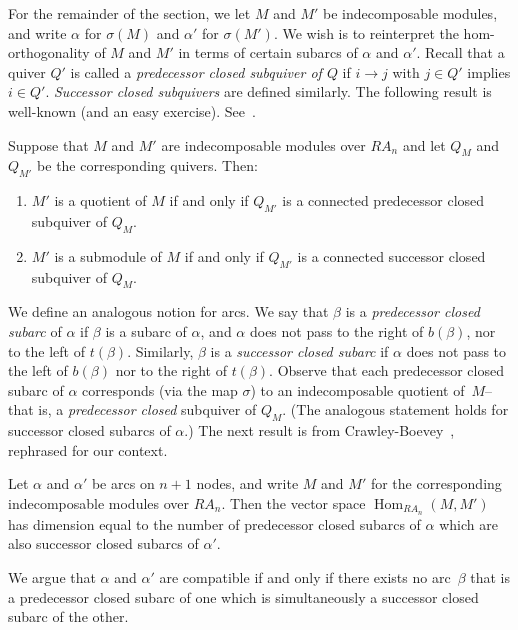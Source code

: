 \documentclass[ALCO,ThmDefs,Unicode,epreuves]{cedram}
\DeclareMathOperator{\Hom}{Hom}
\newcommand{\calT}{\mathcal{T}}
\renewcommand{\1}{\hat{1}}
\newcommand{\0}{\hat{0}}
\newcommand{\newword}[1]{\emph{#1}}
\begin{document}
For the remainder of the section, we let $M$ and $M'$ be indecomposable modules, and write $\alpha$ for $\sigma(M)$ and $\alpha'$ for $\sigma(M')$.
We wish is to reinterpret the hom-orthogonality of $M$ and $M'$ in terms of certain subarcs of $\alpha$ and $\alpha'$.
 Recall that a quiver $Q'$ is called a \newword{predecessor closed subquiver of $Q$} if
$i\rightarrow j$ with $j\in Q'$ implies $i\in Q'$. \newword{Successor closed
subquivers} are defined similarly.
The following result is well-known (and an easy exercise).
See~\cite[Section~2]{Crawley-Boevey}.
\begin{proposition}\label{cor: factors and subs}
Suppose that $M$ and $M'$ are indecomposable modules over $RA_n$
and let $Q_M$ and $Q_{M'}$ be the corresponding quivers.
Then:
\begin{enumerate}
\item $M'$ is a quotient of $M$ if and only if $Q_{M'}$ is a connected predecessor closed subquiver of $Q_M$.
\item $M'$ is a submodule of $M$ if and only if $Q_{M'}$ is a connected successor closed subquiver of $Q_M$.
\end{enumerate}
\end{proposition}

We define an analogous notion for arcs.
We say that $\beta$ is a \newword{predecessor closed subarc} of $\alpha$ if $\beta$ is a subarc of $\alpha$, and $\alpha$ does not pass to the right of $b(\beta)$, nor to the left of $t(\beta)$.
Similarly, $\beta$ is a \newword{successor closed subarc} if $\alpha$ does not pass to the left of $b(\beta)$ nor to the right of $t(\beta)$.
Observe that each predecessor closed subarc of $\alpha$ corresponds (via the map $\sigma$) to an indecomposable quotient of~$M$--that is, a \emph{predecessor closed} subquiver of $Q_M$.
(The analogous statement holds for successor closed subarcs of $\alpha$.)
The next result is from Crawley-Boevey~\cite[Section~2]{Crawley-Boevey}, rephrased for our context.

\begin{proposition}\label{prop:homs-between-shards}
Let $\alpha$ and $\alpha'$ be arcs on $n+1$ nodes, and write $M$ and $M'$ for the corresponding indecomposable modules over $RA_n$.
Then the vector space $\Hom_{RA_n} (M, M')$ has dimension equal to the number of predecessor closed subarcs of $\alpha$ which are also successor closed subarcs of $\alpha'$.
\end{proposition}

We argue that $\alpha$ and $\alpha'$ are compatible if and only if
there exists no arc~$\beta$ that is a predecessor closed subarc of one
which is simultaneously a successor closed subarc of the other.
\end{document}
